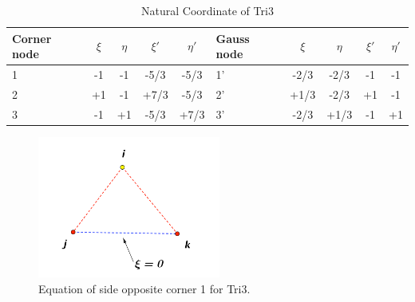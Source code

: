 \begin{table}
	\centering
	\caption{Natural Coordinate of Tri3} \label{tab: Tri3}
	\begin{tabular}{p{1cm}ccccp{1cm}cccc}	
		
		\hline
		Corner node\centering& $\xi$& $\eta$& $\xi'$& $\eta'$& Gauss node\centering& $\xi$& $\eta$& $\xi'$& $\eta'$ \\
		\hline
		1\centering& -1& -1& -5/3& -5/3& 1'\centering& -2/3& -2/3& -1& -1 \\
		2\centering& +1& -1& +7/3& -5/3& 2'\centering&+1/3 & -2/3& +1& -1 \\
		3\centering& -1& +1& -5/3& +7/3& 3'\centering& -2/3& +1/3& -1& +1\\
		\hline
		
	\end{tabular}
\end{table}			

\begin{figure}[h]
	\begin{center}
		\includegraphics[width=6cm,clip]{Tri3_2.pdf}			
		\caption{Equation of side opposite corner 1 for Tri3.} \label{fig: Tri3_2}
	\end{center} 
\end{figure}

